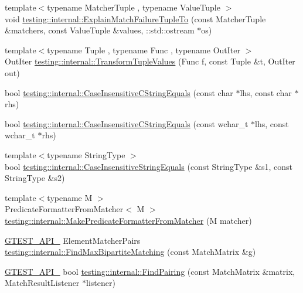 \begin{DoxyCompactItemize}
\item 
{\footnotesize template$<$typename Matcher\+Tuple , typename Value\+Tuple $>$ }\\void \hyperlink{namespacetesting_1_1internal_afd62fd8914a7fae1bfc8a314fcc81f22}{testing\+::internal\+::\+Explain\+Match\+Failure\+Tuple\+To} (const Matcher\+Tuple \&matchers, const Value\+Tuple \&values, \+::std\+::ostream $\ast$os)
\item 
{\footnotesize template$<$typename Tuple , typename Func , typename Out\+Iter $>$ }\\Out\+Iter \hyperlink{namespacetesting_1_1internal_a07ba091a64aa2ba95e41accc55dc8855}{testing\+::internal\+::\+Transform\+Tuple\+Values} (Func f, const Tuple \&t, Out\+Iter out)
\item 
bool \hyperlink{namespacetesting_1_1internal_aebfd0cd34de52d7973a5b2d03ba848cf}{testing\+::internal\+::\+Case\+Insensitive\+C\+String\+Equals} (const char $\ast$lhs, const char $\ast$rhs)
\item 
bool \hyperlink{namespacetesting_1_1internal_ad5b31f61a3cc5b4226d3560f5b48f4dd}{testing\+::internal\+::\+Case\+Insensitive\+C\+String\+Equals} (const wchar\+\_\+t $\ast$lhs, const wchar\+\_\+t $\ast$rhs)
\item 
{\footnotesize template$<$typename String\+Type $>$ }\\bool \hyperlink{namespacetesting_1_1internal_a383de24b1cca6648c14b03964c0ed843}{testing\+::internal\+::\+Case\+Insensitive\+String\+Equals} (const String\+Type \&s1, const String\+Type \&s2)
\item 
{\footnotesize template$<$typename M $>$ }\\Predicate\+Formatter\+From\+Matcher$<$ M $>$ \hyperlink{namespacetesting_1_1internal_a3fd0f30ec03d577bba3e1aa13241e17d}{testing\+::internal\+::\+Make\+Predicate\+Formatter\+From\+Matcher} (M matcher)
\item 
\hyperlink{gtest-port_8h_aa73be6f0ba4a7456180a94904ce17790}{G\+T\+E\+S\+T\+\_\+\+A\+P\+I\+\_\+} Element\+Matcher\+Pairs \hyperlink{namespacetesting_1_1internal_ae30bd8357c179334b2b09b0d689efccc}{testing\+::internal\+::\+Find\+Max\+Bipartite\+Matching} (const Match\+Matrix \&g)
\item 
\hyperlink{gtest-port_8h_aa73be6f0ba4a7456180a94904ce17790}{G\+T\+E\+S\+T\+\_\+\+A\+P\+I\+\_\+} bool \hyperlink{namespacetesting_1_1internal_af2bd2e350b56422a3d9d3b986ac1df0e}{testing\+::internal\+::\+Find\+Pairing} (const Match\+Matrix \&matrix, Match\+Result\+Listener $\ast$listener)
\item 

\end{DoxyCompactItemize}
